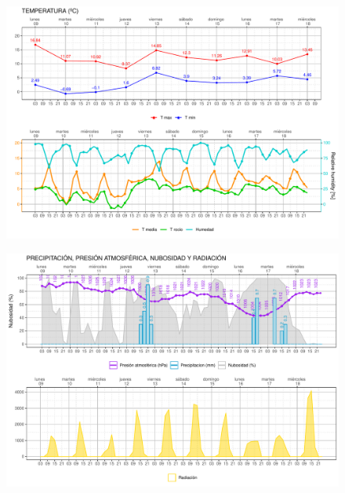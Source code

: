 \documentclass[[a4paper,landscape]{article}\usepackage[]{graphicx}\usepackage[]{color}
\makeatletter
\def\maxwidth{ %
  \ifdim\Gin@nat@width>\linewidth
    \linewidth
  \else
    \Gin@nat@width
  \fi
}
\newenvironment{knitrout}{}{} %
\makeatother
\begin{document}

\begin{figure}
\begin{knitrout}
\color{fgcolor}
\includegraphics[width=\maxwidth]{figure/Figtemperatura-1} 

\end{knitrout}
\end{figure}


\begin{figure}
\begin{knitrout}
\color{fgcolor}
\includegraphics[width=\maxwidth]{figure/Figprecipitacion-1} 

\end{knitrout}
\end{figure}
\end{document}

